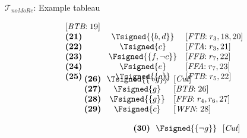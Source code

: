 \begin{frame}{$\mathcal{T}_{\textit{noMoRe}}$: Example tableau}
\begin{center}
\begin{minipage}[t]{16cm}
\begin{minipage}[t]{6cm}
\[\begin{array}{lcl}
  [\textit{BTB}{:}\;\text{19}]                     \\
\textbf{(21)}                                      &
  \Tsigned{\{b,d\}}                                &
  [\textit{FTB}{:}\;r_3, \text{18}, \text{20}]     \\
\textbf{(22)}                                      &
  \Tsigned{c}                                      &
  [\textit{FTA}{:}\;r_3, \text{21}]                \\
\textbf{(23)}                                      &
  \Fsigned{\{f,\neg c\}}                   &
  [\textit{FFB}{:}\;r_7, \text{22}]                \\
\textbf{(24)}                                      &
  \Fsigned{e}                                      &
  [\textit{FFA}{:}\;r_7, \text{23}]                \\
\textbf{(25)}                                      &
  \Tsigned{\{c\}}                                  &
  [\textit{FTB}{:}\;r_5, \text{22}]
\vspace{-0.7cm}
\end{array}
\]
\begin{minipage}[t]{1cm}
\[
\hspace{0.25cm}
\begin{array}{l@{~~}c@{~~}l}
\textbf{(26)}                                      &
  \Tsigned{\{\neg g\}}                     &
  [\textit{Cut}]                                   \\
\textbf{(27)}                                      &
  \Fsigned{g}                                      &
  [\textit{BTB}{:}\;\text{26}]                     \\
\textbf{(28)}                                      & \hspace{-0.1cm}
  \Fsigned{\{g\}}                                  \hspace{-0.1cm} &
  [\textit{FFB}{:}\;r_4, r_6, \text{27}]           \\
\textbf{(29)}                                      &
  \Fsigned{c}                                      &
  [\textit{WFN}{:}\;\text{28}]
\end{array}
\]
\end{minipage}
\begin{minipage}[t]{2cm}
\[
\hspace{2.75cm}
\begin{array}{l@{~~}c@{~~}l}
\textbf{(30)}                                      &
  \Fsigned{\{\neg g\}}                     &
  [\textit{Cut}]                                   \\

\end{array}\]
\end{minipage}
\end{minipage}
\end{minipage}
\end{center}
\end{frame}
